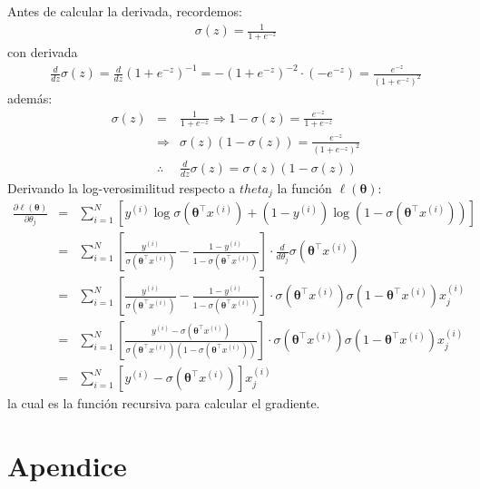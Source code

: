 \documentclass[12pt]{article}
\begin{document}
Antes de calcular la derivada, recordemos:
\begin{eqnarray}
\sigma(z) = \frac{1}{1 + e^{-z}}
\end{eqnarray}
con derivada
\begin{eqnarray}
\frac{d}{dz} \sigma(z) = \frac{d}{dz} \left(1 + e^{-z} \right)^{-1} = 
-(1 + e^{-z})^{-2} \cdot (-e^{-z}) =
\frac{e^{-z}}{(1 + e^{-z})^2}
\end{eqnarray}
además:
\begin{eqnarray}
\sigma(z) &=& \frac{1}{1 + e^{-z}} \Rightarrow 1 - \sigma(z) = \frac{e^{-z}}{1 + e^{-z}}\\
&\Rightarrow& \sigma(z)(1 - \sigma(z)) = \frac{e^{-z}}{(1 + e^{-z})^2}\\
&\therefore& \frac{d}{dz} \sigma(z) = \sigma(z)(1 - \sigma(z))
\end{eqnarray}
Derivando la log-verosimilitud respecto a $theta_{j}$ la función $\ell(\boldsymbol{\theta})$:
\begin{eqnarray}
\frac{\partial \ell(\boldsymbol{\theta})}{\partial \theta_j} &=& 
\sum_{i=1}^{N} \left[ y^{(i)} \log \sigma(\boldsymbol{\theta}^{\top} x^{(i)}) +
(1 - y^{(i)}) \log (1 - \sigma(\boldsymbol{\theta}^{\top} x^{(i)})) \right]\\
&=& \sum_{i=1}^{N} \left[ \frac{y^{(i)}}{\sigma(\boldsymbol{\theta}^{\top} x^{(i)})} 
- \frac{1 - y^{(i)}}{1 - \sigma(\boldsymbol{\theta}^{\top} x^{(i)})} \right]
\cdot \frac{d}{d\theta_j} \sigma(\boldsymbol{\theta}^{\top} x^{(i)})\\
&=& \sum_{i=1}^{N} \left[ \frac{y^{(i)}}{\sigma(\boldsymbol{\theta}^{\top} x^{(i)})} 
- \frac{1 - y^{(i)}}{1 - \sigma(\boldsymbol{\theta}^{\top} x^{(i)})} \right]
\cdot  \sigma(\boldsymbol{\theta}^{\top} x^{(i)})\sigma(1-\boldsymbol{\theta}^{\top} x^{(i)})x_{j}^{(i)}\\
&=& \sum_{i=1}^{N} \left[ \frac{y^{(i)}- \sigma(\boldsymbol{\theta}^{\top}x^{(i)})}
{\sigma(\boldsymbol{\theta}^{\top} x^{(i)})(1 - \sigma(\boldsymbol{\theta}^{\top} x^{(i)}))} \right]
\cdot  \sigma(\boldsymbol{\theta}^{\top} x^{(i)})\sigma(1-\boldsymbol{\theta}^{\top} x^{(i)})x_{j}^{(i)}\\
&=&\sum_{i=1}^{N}\left[y^{(i)}-\sigma(\boldsymbol{\theta}^{\top} x^{(i)})\right]x_{j}^{(i)} 
\end{eqnarray}
la cual es la funci\'on recursiva para calcular el gradiente.


\section{Apendice}
\end{document}
